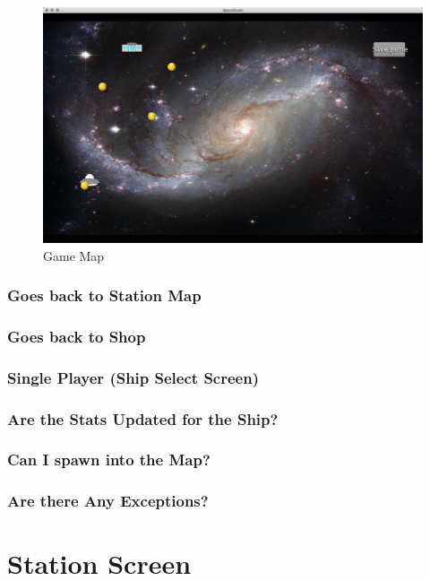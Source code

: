 \documentclass[11pt]{article}
\begin{document}
\begin{figure}
\centering
\includegraphics[scale=0.3]{TestProtocolBilder/map.png}
\caption{Game Map}
\end{figure}
\subsubsection{Goes back to Station Map}
\subsubsection{Goes back to Shop}


\subsubsection{Single Player (Ship Select Screen)}

\subsubsection{Are the Stats Updated for the Ship?}
\subsubsection{Can I spawn into the Map?}
\subsubsection{Are there Any Exceptions?}



\section{Station Screen}
\label{sec:orga891bce}
\end{document}
